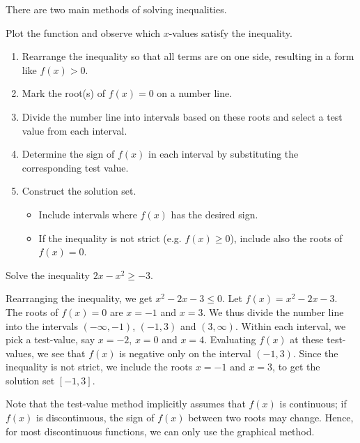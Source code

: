 There are two main methods of solving inequalities.

\begin{recipe}
    Plot the function and observe which $x$-values satisfy the inequality.
\end{recipe}
\begin{recipe}
    \phantom{.}
    \begin{enumerate}
        \item Rearrange the inequality so that all terms are on one side, resulting in a form like $f(x) > 0$.
        \item Mark the root(s) of $f(x) = 0$ on a number line.
        \item Divide the number line into intervals based on these roots and select a test value from each interval.
        \item Determine the sign of $f(x)$ in each interval by substituting the corresponding test value.
        \item Construct the solution set.
        \begin{itemize}
            \item Include intervals where $f(x)$ has the desired sign.
            \item If the inequality is not strict (e.g. $f(x) \geq 0$), include also the roots of $f(x) = 0$.
        \end{itemize}
    \end{enumerate}
\end{recipe}

\begin{sample}
    Solve the inequality $2x - x^2 \geq -3$.
\end{sample}
\begin{sampans}
    Rearranging the inequality, we get $x^2 - 2x - 3 \leq 0$. Let $f(x) = x^2 - 2x - 3$. The roots of $f(x) = 0$ are $x = -1$ and $x = 3$. We thus divide the number line into the intervals $(-\infty, -1)$, $(-1, 3)$ and $(3, \infty)$. Within each interval, we pick a test-value, say $x = -2$, $x = 0$ and $x = 4$. Evaluating $f(x)$ at these test-values, we see that $f(x)$ is negative only on the interval $(-1, 3)$. Since the inequality is not strict, we include the roots $x = -1$ and $x = 3$, to get the solution set $[-1, 3]$.
\end{sampans}

Note that the test-value method implicitly assumes that $f(x)$ is continuous; if $f(x)$ is discontinuous, the sign of $f(x)$ between two roots may change. Hence, for most discontinuous functions, we can only use the graphical method.

